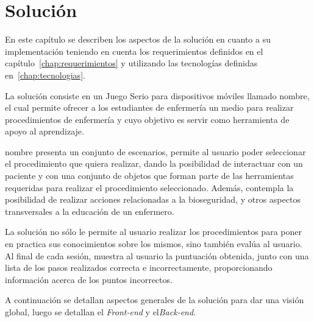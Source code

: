 \chapter{Solución}
\label{chap:solucion}



En este capítulo se describen los aspectos de la solución en cuanto a su
implementación teniendo en cuenta los requerimientos definidos en el
capítulo~\ref{chap:requerimientos} y utilizando las tecnologías definidas
en~\ref{chap:tecnologias}.

La solución consiste en un Juego Serio para dispositivos móviles llamado
\Gls{nombre}, el cual permite ofrecer a los  estudiantes de enfermería un
medio para realizar procedimientos de enfermería y cuyo objetivo es servir como
herramienta de apoyo al aprendizaje.

\Gls{nombre} presenta un conjunto de escenarios, permite al usuario poder
seleccionar el procedimiento que quiera realizar, dando la posibilidad de
interactuar con un paciente y con una conjunto de objetos que forman parte de
las herramientas requeridas para realizar el procedimiento seleccionado. Además,
contempla la posibilidad de realizar acciones relacionadas a la bioseguridad, y
otros aspectos transversales a la educación de un enfermero.

La solución no sólo le permite al usuario realizar los procedimientos para poner
en practica sus conocimientos sobre los mismos, sino también evalúa al usuario.
Al final de cada sesión, muestra al usuario la puntuación obtenida, junto con
una lista de los pasos realizados correcta e incorrectamente, proporcionando
información acerca de los puntos incorrectos.

A continuación se detallan aspectos generales de la solución para 
dar una visión global, luego se detallan el \emph{Front-end} y 
el\emph{Back-end}.






